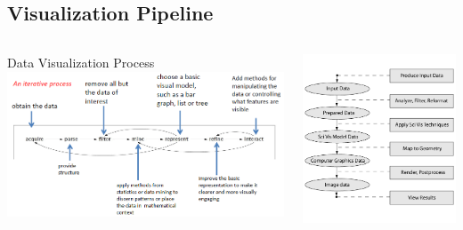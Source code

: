 \subsection{Visualization Pipeline}
\begin{frame}

\begin{columns}
\begin{column}{8cm}
        \begin{beamerboxesrounded}[upper=block head,lower=block body,shadow=true]{\textcolor{DarkBlue}{} Data Visualization Process}
                \includegraphics[width=\columnwidth]{figs/viz/viz_pipeline-loop}
        \end{beamerboxesrounded}
\end{column}
\begin{column}{4.5cm}
        \includegraphics[width=\columnwidth]{figs/viz/viz-pipeline4}
\end{column}
\end{columns}


\end{frame}
